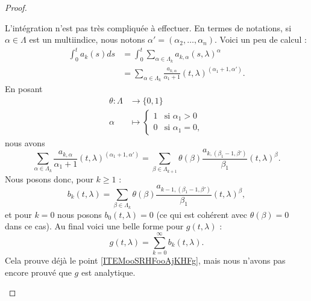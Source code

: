 \begin{proof}
\begin{subproof}
		L'intégration n'est pas très compliquée à effectuer. En termes de notations, si \( \alpha\in\Lambda\) est un multiindice, nous notons \( \alpha'=(\alpha_2,\ldots,\alpha_n)\). Voici un peu de calcul :
		\begin{subequations}
			\begin{align}
				\int_0^ta_k(s)ds & =\int_0^t\sum_{\alpha\in \Lambda_k}a_{k,\alpha}(s,\lambda)^{\alpha}                              \\
				                 & =\sum_{\alpha\in\Lambda_k}\frac{ a_{k,\alpha} }{ \alpha_1+1 }(t,\lambda)^{(\alpha_1+1,\alpha')}.
			\end{align}
		\end{subequations}
		En posant
		\begin{equation}
			\begin{aligned}
				\theta\colon \Lambda & \to \{ 0,1 \}                     \\
				\alpha               & \mapsto \begin{cases}
					                               1 & \text{si } \alpha_1>0 \\
					                               0 & \text{si }\alpha_1=0,
				                               \end{cases}
			\end{aligned}
		\end{equation}
		nous avons
		\begin{equation}
			\sum_{\alpha\in \Lambda_k}\frac{ a_{k,\alpha} }{ \alpha_1+1 }(t,\lambda)^{(\alpha_1+1,\alpha')}=\sum_{\beta\in\Lambda_{k+1}}\theta(\beta)\frac{ a_{k,(\beta_1-1,\beta')} }{ \beta_1 }(t,\lambda)^{\beta}.
		\end{equation}
		Nous posons donc, pour \( k\geq 1\) :
		\begin{equation}
			b_k(t,\lambda)=\sum_{\beta\in\Lambda_k}\theta(\beta)\frac{ a_{k-1,(\beta_1-1,\beta')} }{ \beta_1 }(t,\lambda)^{\beta},
		\end{equation}
		et pour \( k=0\) nous posons \( b_0(t,\lambda)=0\) (ce qui est cohérent avec \( \theta(\beta)=0\) dans ce cas). Au final voici une belle forme pour \( g(t,\lambda)\) :
		\begin{equation}
			g(t,\lambda)=\sum_{k=0}^{\infty}b_k(t,\lambda).
		\end{equation}
		Cela prouve déjà le point \ref{ITEMooSRHFooAjKHFg}, mais nous n'avons pas encore prouvé que \( g\) est analytique.


\end{subproof}
\end{proof}
